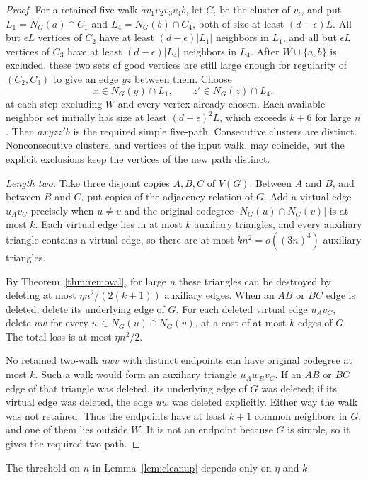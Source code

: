 \begin{proof}
For a retained five-walk $av_1v_2v_3v_4b$, let $C_i$ be the cluster of $v_i$, and put $L_1=N_G(a)\cap C_1$ and $L_4=N_G(b)\cap C_4$, both of size at least $(d-\epsilon)L$. All but $\epsilon L$ vertices of $C_2$ have at least $(d-\epsilon)|L_1|$ neighbors in $L_1$, and all but $\epsilon L$ vertices of $C_3$ have at least $(d-\epsilon)|L_4|$ neighbors in $L_4$. After $W\cup\{a,b\}$ is excluded, these two sets of good vertices are still large enough for regularity of $(C_2,C_3)$ to give an edge $yz$ between them. Choose
\[
 x\in N_G(y)\cap L_1,\qquad z'\in N_G(z)\cap L_4,
\]
at each step excluding $W$ and every vertex already chosen. Each available neighbor set initially has size at least $(d-\epsilon)^2L$, which exceeds $k+6$ for large $n$. Then $axyzz'b$ is the required simple five-path. Consecutive clusters are distinct. Nonconsecutive clusters, and vertices of the input walk, may coincide, but the explicit exclusions keep the vertices of the new path distinct.

\emph{Length two.}
Take three disjoint copies $A,B,C$ of $V(G)$. Between $A$ and $B$, and between $B$ and $C$, put copies of the adjacency relation of $G$. Add a virtual edge $u_Av_C$ precisely when $u\ne v$ and the original codegree $|N_G(u)\cap N_G(v)|$ is at most $k$. Each virtual edge lies in at most $k$ auxiliary triangles, and every auxiliary triangle contains a virtual edge, so there are at most $kn^2=o((3n)^3)$ auxiliary triangles.

By Theorem~\ref{thm:removal}, for large $n$ these triangles can be destroyed by deleting at most $\eta n^2/(2(k+1))$ auxiliary edges. When an $AB$ or $BC$ edge is deleted, delete its underlying edge of $G$. For each deleted virtual edge $u_Av_C$, delete $uw$ for every $w\in N_G(u)\cap N_G(v)$, at a cost of at most $k$ edges of $G$. The total loss is at most $\eta n^2/2$.

No retained two-walk $uwv$ with distinct endpoints can have original codegree at most $k$. Such a walk would form an auxiliary triangle $u_Aw_Bv_C$. If an $AB$ or $BC$ edge of that triangle was deleted, its underlying edge of $G$ was deleted; if its virtual edge was deleted, the edge $uw$ was deleted explicitly. Either way the walk was not retained. Thus the endpoints have at least $k+1$ common neighbors in $G$, and one of them lies outside $W$. It is not an endpoint because $G$ is simple, so it gives the required two-path.
\end{proof}
The threshold on $n$ in Lemma~\ref{lem:cleanup} depends only on $\eta$ and $k$.

